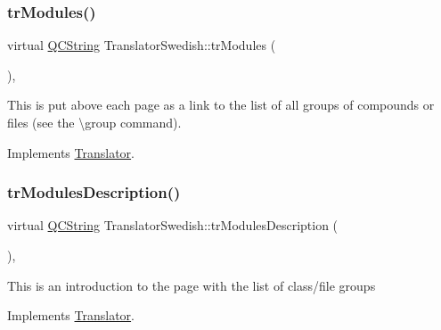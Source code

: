 \mbox{\label{class_translator_swedish_ac0c39952699b6b22ccf6c41646a034da}} 
\subsubsection{\texorpdfstring{trModules()}{trModules()}}
{\footnotesize\ttfamily virtual \mbox{\hyperlink{class_q_c_string}{Q\+C\+String}} Translator\+Swedish\+::tr\+Modules (\begin{DoxyParamCaption}{ }\end{DoxyParamCaption})\hspace{0.3cm}{\ttfamily [inline]}, {\ttfamily [virtual]}}

This is put above each page as a link to the list of all groups of compounds or files (see the \textbackslash{}group command). 

Implements \mbox{\hyperlink{class_translator}{Translator}}.

\mbox{\label{class_translator_swedish_ad4c9c5fa99d650ea7331528814dc5421}} 
\subsubsection{\texorpdfstring{trModulesDescription()}{trModulesDescription()}}
{\footnotesize\ttfamily virtual \mbox{\hyperlink{class_q_c_string}{Q\+C\+String}} Translator\+Swedish\+::tr\+Modules\+Description (\begin{DoxyParamCaption}{ }\end{DoxyParamCaption})\hspace{0.3cm}{\ttfamily [inline]}, {\ttfamily [virtual]}}

This is an introduction to the page with the list of class/file groups 

Implements \mbox{\hyperlink{class_translator}{Translator}}.

\mbox{\label{class_translator_swedish_ad3c96e98310c6d8988a61fa7b37ad440}} 
